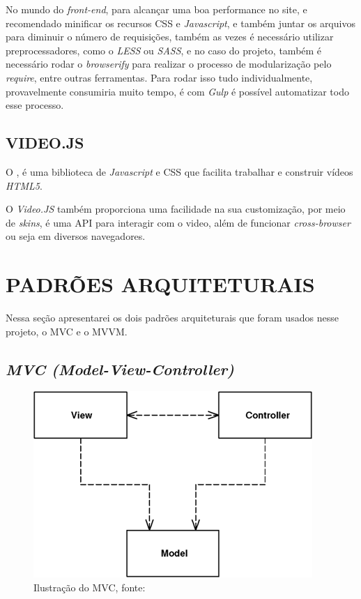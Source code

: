 No mundo do \textit{front-end}, para alcançar uma boa performance no site, e recomendado minificar os recursos \ac{CSS} e \textit{Javascript}, e também juntar os arquivos para diminuir o número de requisições, também as vezes é necessário utilizar preprocessadores, como o \textit{LESS} ou \textit{SASS}, e no caso do projeto, também é necessário rodar o \textit{browserify} para realizar o processo de modularização pelo \textit{require}, entre outras ferramentas. Para rodar isso tudo individualmente, provavelmente consumiria muito tempo, é com \textit{Gulp} é possível automatizar todo esse processo.

\subsection{VIDEO.JS}
O , é uma biblioteca de \textit{Javascript} e \ac{CSS} que facilita trabalhar e construir vídeos \textit{HTML5}.

O \textit{Video.JS} também proporciona uma facilidade na sua customização, por meio de \textit{skins}, é uma \ac{API} para interagir com o video, além de funcionar \textit{cross-browser} ou seja em diversos navegadores.

\newpage
\section{PADRÕES ARQUITETURAIS}
Nessa seção apresentarei os dois padrões arquiteturais que foram usados nesse projeto, o \ac{MVC} e o \ac{MVVM}.

\subsection{\textit{MVC (Model-View-Controller)}}
    \begin{figure}[h]
        \centering
        \includegraphics[keepaspectratio=true,scale=0.7]{figuras/mvc-fowler.png}
        \caption{Ilustração do \ac{MVC}, fonte: \cite{martin_fowler_patterns}}
        \label{fig:mvc-fowler}
    \end{figure}

